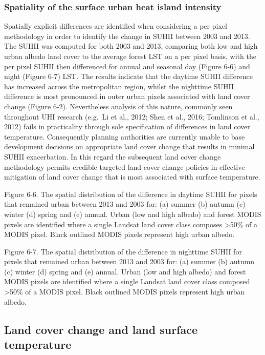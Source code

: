 \documentclass[]{book}
\begin{document}
\subsubsection{Spatiality of the surface urban heat island
intensity}\label{spatiality-of-the-surface-urban-heat-island-intensity}

Spatially explicit differences are identified when considering a per
pixel methodology in order to identify the change in SUHII between 2003
and 2013. The SUHII was computed for both 2003 and 2013, comparing both
low and high urban albedo land cover to the average forest LST on a per
pixel basis, with the per pixel SUHII then differenced for annual and
seasonal day (Figure 6-6) and night (Figure 6-7) LST. The results
indicate that the daytime SUHII difference has increased across the
metropolitan region, whilst the nighttime SUHII difference is most
pronounced in outer urban pixels associated with land cover change
(Figure 6-2). Nevertheless analysis of this nature, commonly seen
throughout UHI research (e.g.~Li et al., 2012; Shen et al., 2016;
Tomlinson et al., 2012) fails in practicality through sole specification
of differences in land cover temperature. Consequently planning
authorities are currently unable to base development decisions on
appropriate land cover change that results in minimal SUHII
exacerbation. In this regard the subsequent land cover change
methodology permits credible targeted land cover change policies in
effective mitigation of land cover change that is most associated with
surface temperature.

Figure 6-6. The spatial distribution of the difference in daytime SUHII
for pixels that remained urban between 2013 and 2003 for: (a) summer (b)
autumn (c) winter (d) spring and (e) annual. Urban (low and high albedo)
and forest MODIS pixels are identified where a single Landsat land cover
class composes \textgreater{}50\% of a MODIS pixel. Black outlined MODIS
pixels represent high urban albedo.

Figure 6-7. The spatial distribution of the difference in nighttime
SUHII for pixels that remained urban between 2013 and 2003 for: (a)
summer (b) autumn (c) winter (d) spring and (e) annual. Urban (low and
high albedo) and forest MODIS pixels are identified where a single
Landsat land cover class composed \textgreater{}50\% of a MODIS pixel.
Black outlined MODIS pixels represent high urban albedo.

\subsection{Land cover change and land surface
temperature}\label{land-cover-change-and-land-surface-temperature}
\end{document}
